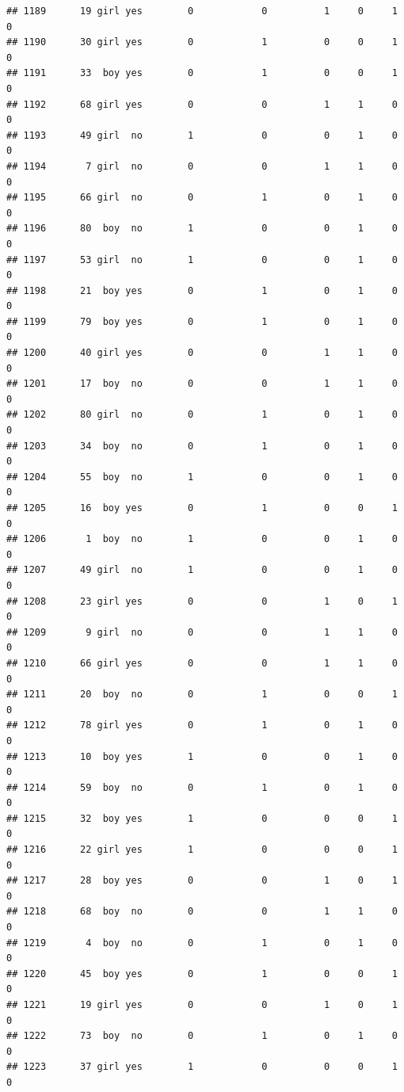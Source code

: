 \documentclass[man]{apa6}
\begin{document}
\begin{verbatim}
## 1189      19 girl yes        0            0          1     0     1     0
## 1190      30 girl yes        0            1          0     0     1     0
## 1191      33  boy yes        0            1          0     0     1     0
## 1192      68 girl yes        0            0          1     1     0     0
## 1193      49 girl  no        1            0          0     1     0     0
## 1194       7 girl  no        0            0          1     1     0     0
## 1195      66 girl  no        0            1          0     1     0     0
## 1196      80  boy  no        1            0          0     1     0     0
## 1197      53 girl  no        1            0          0     1     0     0
## 1198      21  boy yes        0            1          0     1     0     0
## 1199      79  boy yes        0            1          0     1     0     0
## 1200      40 girl yes        0            0          1     1     0     0
## 1201      17  boy  no        0            0          1     1     0     0
## 1202      80 girl  no        0            1          0     1     0     0
## 1203      34  boy  no        0            1          0     1     0     0
## 1204      55  boy  no        1            0          0     1     0     0
## 1205      16  boy yes        0            1          0     0     1     0
## 1206       1  boy  no        1            0          0     1     0     0
## 1207      49 girl  no        1            0          0     1     0     0
## 1208      23 girl yes        0            0          1     0     1     0
## 1209       9 girl  no        0            0          1     1     0     0
## 1210      66 girl yes        0            0          1     1     0     0
## 1211      20  boy  no        0            1          0     0     1     0
## 1212      78 girl yes        0            1          0     1     0     0
## 1213      10  boy yes        1            0          0     1     0     0
## 1214      59  boy  no        0            1          0     1     0     0
## 1215      32  boy yes        1            0          0     0     1     0
## 1216      22 girl yes        1            0          0     0     1     0
## 1217      28  boy yes        0            0          1     0     1     0
## 1218      68  boy  no        0            0          1     1     0     0
## 1219       4  boy  no        0            1          0     1     0     0
## 1220      45  boy yes        0            1          0     0     1     0
## 1221      19 girl yes        0            0          1     0     1     0
## 1222      73  boy  no        0            1          0     1     0     0
## 1223      37 girl yes        1            0          0     0     1     0

\end{verbatim}
\end{document}
